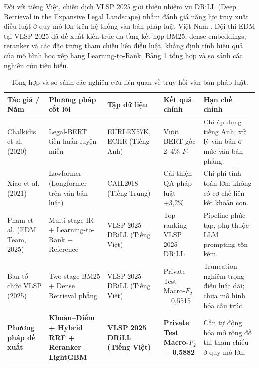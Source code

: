 \documentclass[12pt,a4paper]{article}
\begin{document}
Đối với tiếng Việt, chiến dịch VLSP 2025 giới thiệu nhiệm vụ DRiLL (Deep Retrieval in the Expansive Legal Landscape) nhằm đánh giá năng lực truy xuất điều luật ở quy mô lớn trên hệ thống văn bản pháp luật Việt Nam \cite{vlsp2025drill}. Đội thi EDM tại VLSP 2025 \cite{pham2025edm} đã đề xuất kiến trúc đa tầng kết hợp BM25, dense embeddings, reranker và các đặc trưng tham chiếu liên điều luật, khẳng định tính hiệu quả của mô hình học xếp hạng Learning-to-Rank. Bảng \ref{tab:related-work} tổng hợp và so sánh các nghiên cứu tiêu biểu.

\begin{table}[htbp]
\centering
\caption{Tổng hợp và so sánh các nghiên cứu liên quan về truy hồi văn bản pháp luật.}
\label{tab:related-work}
\scriptsize
\begin{tabularx}{\textwidth}{>{\raggedright\arraybackslash}p{2.6cm} >{\raggedright\arraybackslash}p{2.8cm} >{\raggedright\arraybackslash}p{2.1cm} >{\raggedright\arraybackslash}p{2.3cm} X}
\toprule
\textbf{Tác giả / Năm} & \textbf{Phương pháp cốt lõi} & \textbf{Tập dữ liệu} & \textbf{Kết quả chính} & \textbf{Hạn chế chính} \\
\midrule
Chalkidis et al. (2020) \cite{chalkidis2020legal} & Legal-BERT tiền huấn luyện miền & EURLEX57K, ECHR (Tiếng Anh) & Vượt BERT gốc 2--4\% $F_1$ & Chỉ áp dụng tiếng Anh; xử lý văn bản ở mức văn bản phẳng. \\
\addlinespace
Xiao et al. (2021) \cite{xiao2021lawformer} & Lawformer (Longformer trên văn bản luật) & CAIL2018 (Tiếng Trung) & Cải thiện QA pháp luật +3,2\% & Chi phí tính toán lớn; không có cơ chế liên kết khoản con. \\
\addlinespace
Pham et al. (EDM Team, 2025) \cite{pham2025edm} & Multi-stage IR + Learning-to-Rank + Reference & VLSP 2025 DRiLL (Tiếng Việt) & Top ranking VLSP 2025 DRiLL & Pipeline phức tạp, phụ thuộc LLM prompting tốn kém. \\
\addlinespace
Ban tổ chức VLSP (2025) \cite{vlsp2025drill} & Two-stage BM25 + Dense Retrieval phẳng & VLSP 2025 DRiLL (Tiếng Việt) & Private Test Macro-$F_2$ = 0,5515 & Truncation nghiêm trọng điều luật dài; chưa mô hình hóa cấu trúc. \\
\addlinespace
\textbf{Phương pháp đề xuất} & \textbf{Khoản--Điểm + Hybrid RRF + Reranker + LightGBM} & \textbf{VLSP 2025 DRiLL (Tiếng Việt)} & \textbf{Private Test Macro-$F_2$ = 0,5882} & Cần tự động hóa mở rộng đồ thị tham chiếu ở quy mô lớn. \\
\bottomrule
\end{tabularx}
\end{table}
\end{document}
